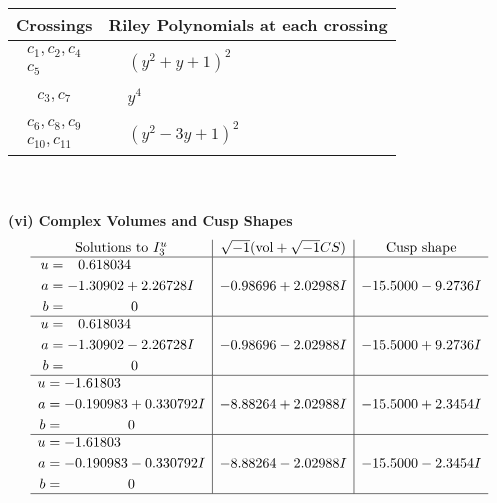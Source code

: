 \documentclass[1p]{elsarticle_modified}
\theoremstyle{definition}
\newcommand{\I}{\sqrt{-1}}
\begin{document}
\begin{tabular}{m{50pt}|m{274pt}}
Crossings & \hspace{64pt}Riley Polynomials at each crossing \\
\hline $$\begin{aligned}c_{1},c_{2},c_{4}\\c_{5}\end{aligned}$$&$\begin{aligned}
&(y^2+y+1)^2
\end{aligned}$\\
\hline $$\begin{aligned}c_{3},c_{7}\end{aligned}$$&$\begin{aligned}
&y^4
\end{aligned}$\\
\hline $$\begin{aligned}c_{6},c_{8},c_{9}\\c_{10},c_{11}\end{aligned}$$&$\begin{aligned}
&(y^2-3 y+1)^2
\end{aligned}$\\
\hline
\end{tabular}\\~\\
\newpage\flushleft \textbf{(vi) Complex Volumes and Cusp Shapes}
$$\begin{array}{c|c|c}  
\text{Solutions to }I^u_{3}& \I (\text{vol} + \sqrt{-1}CS) & \text{Cusp shape}\\
 \hline 
\begin{aligned}
u &= \phantom{-}0.618034\phantom{ +0.000000I} \\
a &= -1.30902 + 2.26728 I \\
b &= \phantom{-0.000000 } 0\end{aligned}
 & -0.98696 + 2.02988 I & -15.5000 - 9.2736 I \\ \hline\begin{aligned}
u &= \phantom{-}0.618034\phantom{ +0.000000I} \\
a &= -1.30902 - 2.26728 I \\
b &= \phantom{-0.000000 } 0\end{aligned}
 & -0.98696 - 2.02988 I & -15.5000 + 9.2736 I \\ \hline\begin{aligned}
u &= -1.61803\phantom{ +0.000000I} \\
a &= -0.190983 + 0.330792 I \\
b &= \phantom{-0.000000 } 0\end{aligned}
 & -8.88264 + 2.02988 I & -15.5000 + 2.3454 I \\ \hline\begin{aligned}
u &= -1.61803\phantom{ +0.000000I} \\
a &= -0.190983 - 0.330792 I \\
b &= \phantom{-0.000000 } 0\end{aligned}
 & -8.88264 - 2.02988 I & -15.5000 - 2.3454 I\\
 \hline 
 \end{array}$$\newpage
\end{document}
